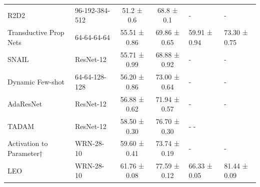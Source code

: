 \begin{table}[htbp]
{\begin{tabular}{
    l 
    l 
    c 
    c 
    l 
    l }
    R2D2                                             & 96-192-384-512                    & 51.2 ± 0.6                                                        & 68.8 ± 0.1                                                        & -                                   & -                                   \\
    Transductive Prop Nets                           & 64-64-64-64                       & 55.51 ± 0.86                                                      & 69.86 ± 0.65                                                      & 59.91 ± 0.94                                                & 73.30 ± 0.75                                                \\
    SNAIL                                            & ResNet-12                         & 55.71 ± 0.99                                                      & 68.88 ± 0.92                                                      & -                                   & -                                   \\
    Dynamic Few-shot                                 & 64-64-128-128                     & 56.20 ± 0.86                                                      & 73.00 ± 0.64                                                      & -                                   & -                                   \\
    AdaResNet                                        & ResNet-12                         & 56.88 ± 0.62                                                      & 71.94 ± 0.57                                                      & -                                   & -                                   \\
    TADAM                                            & ResNet-12                         & 58.50 ± 0.30                                                      & 76.70 ± 0.30                                                      & -             -                                   \\
    Activation to Parameter† & WRN-28-10                         & 59.60 ± 0.41                                                      & 73.74 ± 0.19                                                      & -                                   & -                                   \\
    LEO                                              & WRN-28-10                         & 61.76 ± 0.08                                                      & 77.59 ± 0.12                                                      & 66.33 ± 0.05                                                & 81.44 ± 0.09                                                \\

\end{tabular}}
\end{table}
